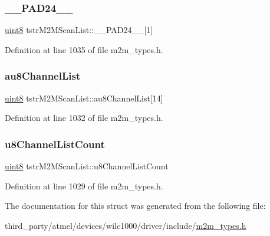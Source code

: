 \subsubsection{\texorpdfstring{\+\_\+\+\_\+\+P\+A\+D24\+\_\+\+\_\+}{\_\_PAD24\_\_}}
{\footnotesize\ttfamily \hyperlink{group__DataT_ga4df709a77647e870bbf1d955b8edc9a6}{uint8} tstr\+M2\+M\+Scan\+List\+::\+\_\+\+\_\+\+P\+A\+D24\+\_\+\+\_\+\mbox{[}1\mbox{]}}



Definition at line 1035 of file m2m\+\_\+types.\+h.

\mbox{\label{structtstrM2MScanList_a1d1bee15f0031a67bd71555d2671e931}} 
\subsubsection{\texorpdfstring{au8\+Channel\+List}{au8ChannelList}}
{\footnotesize\ttfamily \hyperlink{group__DataT_ga4df709a77647e870bbf1d955b8edc9a6}{uint8} tstr\+M2\+M\+Scan\+List\+::au8\+Channel\+List\mbox{[}14\mbox{]}}



Definition at line 1032 of file m2m\+\_\+types.\+h.

\mbox{\label{structtstrM2MScanList_a7e3314bc6fe1cea6d11cad79e8ccc718}} 
\subsubsection{\texorpdfstring{u8\+Channel\+List\+Count}{u8ChannelListCount}}
{\footnotesize\ttfamily \hyperlink{group__DataT_ga4df709a77647e870bbf1d955b8edc9a6}{uint8} tstr\+M2\+M\+Scan\+List\+::u8\+Channel\+List\+Count}



Definition at line 1029 of file m2m\+\_\+types.\+h.



The documentation for this struct was generated from the following file\+:\begin{DoxyCompactItemize}
\item 
third\+\_\+party/atmel/devices/wilc1000/driver/include/\hyperlink{m2m__types_8h}{m2m\+\_\+types.\+h}\end{DoxyCompactItemize}
